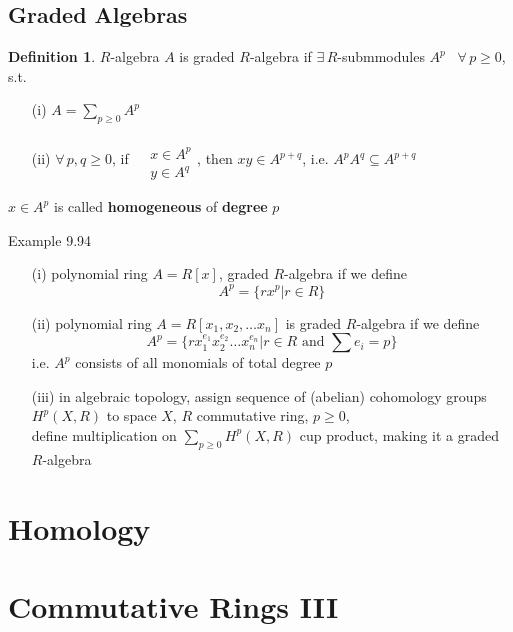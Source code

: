 \documentclass[twoside,landscape]{amsart}
\theoremstyle{plain}
\theoremstyle{definition}
\newtheorem{definition}{Definition}
\theoremstyle{remark}
\begin{document}
\begin{multicols*}{2}
\subsection{Graded Algebras}

\begin{definition}
  $R$-algebra $A$ is graded $R$-algebra if $\exists \, R$-submmodules $A^p$ \, $\forall \, p \geq 0$, s.t. 
\begin{enumerate}
  \item[(i)] $A = \sum_{p\geq 0 } A^p$
\item[(ii)] $\forall \, p ,q \geq 0$, if $\begin{aligned} & \quad \\
  & x \in A^p \\
  & y \in A^q \end{aligned}$, then $xy \in A^{p+q}$, i.e. $A^p A^q \subseteq A^{p+q}$ \\
\end{enumerate}
\end{definition}
$x\in A^p$ is called \textbf{homogeneous} of \textbf{degree} $p$

Example 9.94 
\begin{enumerate}
\item[(i)] polynomial ring $A = R[x]$, graded $R$-algebra if we define 
\[
A^p = \lbrace rx^p | r\in R \rbrace
\]
\item[(ii)] polynomial ring $A = R[x_1, x_2, \dots x_n ]$ is graded $R$-algebra if we define
\[
A^p = \lbrace rx_1^{e_1}x_2^{e_2} \dots x_n^{e_n} | r \in R \text{ and } \sum e_i = p \rbrace
\]
i.e. $A^p$ consists of all monomials of total degree $p$
\item[(iii)] in algebraic topology, assign sequence of (abelian) cohomology groups $H^p(X,R)$ to space $X$, $R$ commutative ring, $p\geq 0$, \\
define multiplication on $\sum_{ p \geq 0} H^p(X,R)$ cup product, making it a graded $R$-algebra
\end{enumerate}

\section{ Homology }



\section{ Commutative Rings III}



\end{multicols*}
\end{document}
